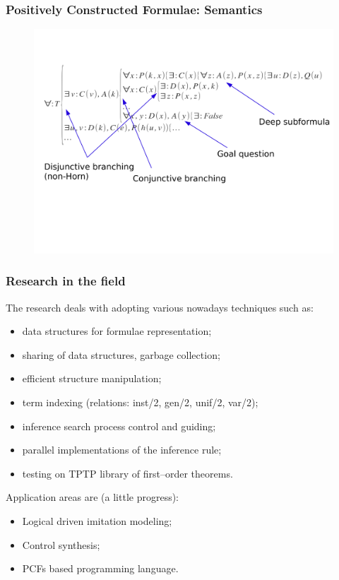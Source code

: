 \documentclass[aspectratio=169]{beamer}
\begin{document}
\begin{frame}
\frametitle{Positively Constructed Formulae: Semantics}
\begin{figure}
\includegraphics[width=0.8\linewidth]{pics/branching}
\end{figure}

\end{frame}


\begin{frame}

\frametitle{Research in the field}
The research deals with adopting various nowadays techniques such as:
\begin{itemize}
\item data structures for formulae representation;
\item sharing of data structures, garbage collection;
\item efficient structure manipulation;
\item term indexing (relations: inst/2, gen/2, unif/2, var/2);
\item inference search process control and guiding;
\item parallel implementations of the inference rule;
\item testing on TPTP library of first--order theorems.
\end{itemize}
Application areas are (a little progress):
\begin{itemize}
\item Logical driven imitation modeling;
\item Control synthesis;
\item PCFs based programming language.
\end{itemize}
\end{frame}
\end{document}
